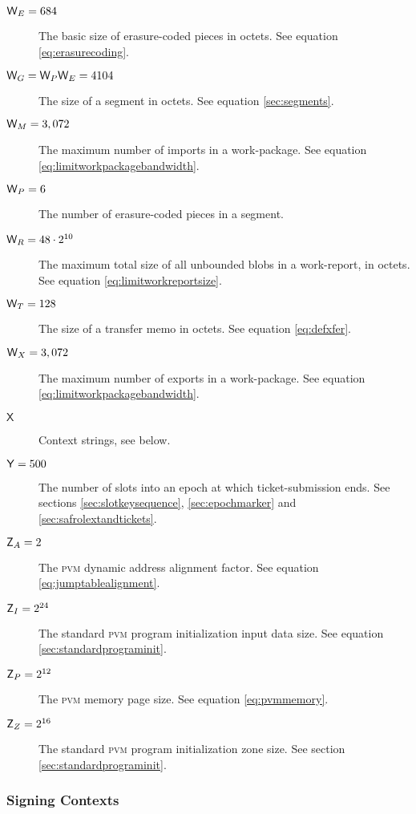 \begin{description}
  \item[$\mathsf{W}_E = 684$] The basic size of erasure-coded pieces in octets. See equation \ref{eq:erasurecoding}.
  \item[$\mathsf{W}_G = \mathsf{W}_P\mathsf{W}_E = 4104$] The size of a segment in octets. See equation \ref{sec:segments}.
  \item[$\mathsf{W}_M = 3,072$] The maximum number of imports in a work-package. See equation \ref{eq:limitworkpackagebandwidth}.
  \item[$\mathsf{W}_P = 6$] The number of erasure-coded pieces in a segment.
  \item[$\mathsf{W}_R = 48\cdot2^{10}$] The maximum total size of all unbounded blobs in a work-report, in octets. See equation \ref{eq:limitworkreportsize}.
  \item[$\mathsf{W}_T = 128$] The size of a transfer memo in octets. See equation \ref{eq:defxfer}.
  \item[$\mathsf{W}_X = 3,072$] The maximum number of exports in a work-package. See equation \ref{eq:limitworkpackagebandwidth}.
  \item[$\mathsf{X}$] Context strings, see below.
  \item[$\mathsf{Y} = 500$] The number of slots into an epoch at which ticket-submission ends. See sections \ref{sec:slotkeysequence}, \ref{sec:epochmarker} and \ref{sec:safrolextandtickets}.
  \item[$\mathsf{Z}_A = 2$] The \textsc{pvm} dynamic address alignment factor. See equation \ref{eq:jumptablealignment}.
  \item[$\mathsf{Z}_I = 2^{24}$] The standard \textsc{pvm} program initialization input data size. See equation \ref{sec:standardprograminit}.
  \item[$\mathsf{Z}_P = 2^{12}$] The \textsc{pvm} memory page size. See equation \ref{eq:pvmmemory}.
  \item[$\mathsf{Z}_Z = 2^{16}$] The standard \textsc{pvm} program initialization zone size. See section \ref{sec:standardprograminit}.
\end{description}

\subsubsection{Signing Contexts}

